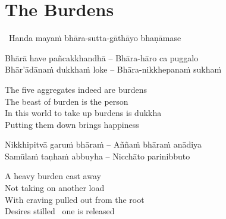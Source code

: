 \suttaRef{[Dhp 85-87.5]}


\section{The Burdens}
\label{burdens}

\begin{leader}
  \anglebracketleft\ \hspace{-0.5mm}Handa mayaṁ bhāra-sutta-gāthāyo bhaṇāmase \hspace{-0.5mm}\anglebracketright\
\end{leader}

\begin{verses}
  Bhārā have pañcakkhandhā – Bhāra-hāro ca puggalo\\
  Bhār'ādānaṁ dukkhaṁ loke – Bhāra-nikkhepanaṁ sukhaṁ
\end{verses}

\begin{english-verses}
  The five aggregates indeed are burdens\\
  The beast of burden is the person\makeatletter\hyperlink{endnote39-appendix}\makeatother\\
  In this world to take up burdens is dukkha\\
  Putting them down brings happiness
\end{english-verses}

\begin{verses}
  Nikkhipitvā garuṁ bhāraṁ – Aññaṁ bhāraṁ anādiya\\
  Samūlaṁ taṇhaṁ abbuyha – Nicchāto parinibbuto
\end{verses}

\begin{english-verses}
  A heavy burden cast away\\
  Not taking on another load\\
  With craving pulled out from the root\\
  Desires stilled \breathmark\ one is released
\end{english-verses}

